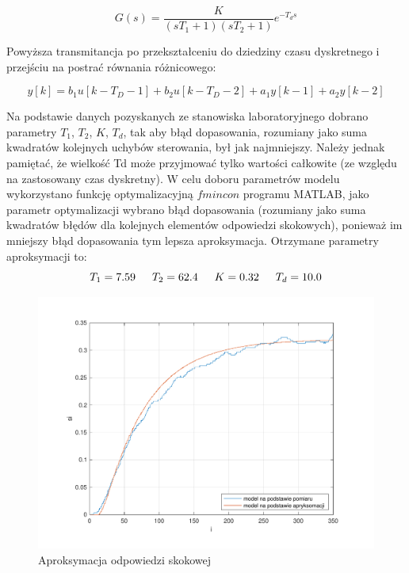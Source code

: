 $$G(s)=\frac{K}{(sT_{1}+1)(sT_{2}+1)}e^{-T_{d}s}$$

Powyższa transmitancja po przekształceniu do dziedziny czasu dyskretnego i przejściu na postrać równania różnicowego:

$$y[k]=b_{1}u[k-T_{D}-1]+b_{2}u[k-T_{D}-2]+a_{1}y[k-1]+a_{2}y[k-2]$$
 
Na podstawie danych pozyskanych ze stanowiska laboratoryjnego dobrano parametry 
$T_{1}$, $T_{2}$, $K$, $T_{d}$, tak aby błąd dopasowania, 
rozumiany jako suma kwadratów kolejnych uchybów sterowania, był jak najmniejszy. 
Należy jednak pamiętać, że wielkość Td może przyjmować tylko wartości całkowite 
(ze względu na zastosowany czas dyskretny). 
W celu doboru parametrów modelu wykorzystano funkcję optymalizacyjną $fmincon$ programu MATLAB, 
jako parametr optymalizacji wybrano błąd dopasowania 
(rozumiany jako suma kwadratów błędów dla kolejnych elementów odpowiedzi skokowych), 
ponieważ im mniejszy błąd dopasowania tym lepsza aproksymacja. \newline
Otrzymane parametry aproksymacji to: \newline
\indent $$T_{1}=\num{7.59}
\indent T_{2}=\num{62.4}
\indent K=\num{0.32}
\indent T_{d}=\num{10.0}$$

\begin{figure}[H]
    \centering
    \includegraphics[scale=0.75]{../lab/zad_3/zad3aprox.pdf}
    \caption{Aproksymacja odpowiedzi skokowej}
\end{figure}


